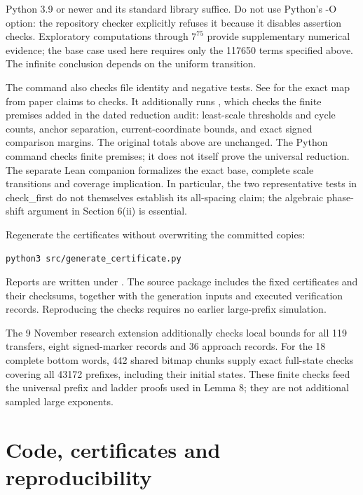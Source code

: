 \documentclass[11pt,a4paper]{article}
\begin{document}
Python 3.9 or newer and its standard library suffice. Do not use Python's -O option: the repository checker explicitly refuses it because it disables assertion checks. Exploratory computations through $7^{75}$ provide supplementary numerical evidence; the base case used here requires only the 117650 terms specified above. The infinite conclusion depends on the uniform transition.

The command also checks file identity and negative tests. See  for the exact map from paper claims to checks. It additionally runs , which checks the finite premises added in the dated reduction audit: least-scale thresholds and cycle counts, anchor separation, current-coordinate bounds, and exact signed comparison margins. The original totals above are unchanged. The Python command checks finite premises; it does not itself prove the universal reduction. The separate Lean companion formalizes the exact base, complete scale transitions and coverage implication. In particular, the two representative tests in check\_first do not themselves establish its all-spacing claim; the algebraic phase-shift argument in Section 6(ii) is essential.

Regenerate the certificates without overwriting the committed copies:

\begin{verbatim}
python3 src/generate_certificate.py
\end{verbatim}

Reports are written under . The source package includes the fixed certificates and their checksums, together with the generation inputs and executed verification records. Reproducing the checks requires no earlier large-prefix simulation.

The 9 November research extension additionally checks local bounds for
all 119 transfers, eight signed-marker records and 36 approach records.
For the 18 complete bottom words, 442 shared bitmap chunks supply exact
full-state checks covering all 43172 prefixes, including their initial
states. These finite checks feed the universal prefix and ladder proofs
used in Lemma 8; they are not additional sampled large exponents.

\section{Code, certificates and reproducibility}
\label{sec:10}
\end{document}

